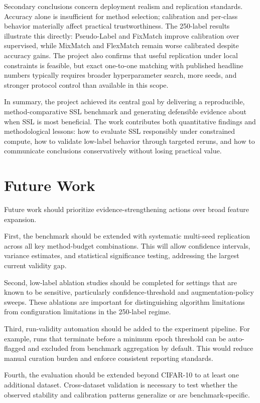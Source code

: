 Secondary conclusions concern deployment realism and replication standards. Accuracy alone is insufficient for method selection; calibration and per-class behavior materially affect practical trustworthiness. The 250-label results illustrate this directly: Pseudo-Label and FixMatch improve calibration over supervised, while MixMatch and FlexMatch remain worse calibrated despite accuracy gains. The project also confirms that useful replication under local constraints is feasible, but exact one-to-one matching with published headline numbers typically requires broader hyperparameter search, more seeds, and stronger protocol control than available in this scope.

In summary, the project achieved its central goal by delivering a reproducible, method-comparative SSL benchmark and generating defensible evidence about when SSL is most beneficial. The work contributes both quantitative findings and methodological lessons: how to evaluate SSL responsibly under constrained compute, how to validate low-label behavior through targeted reruns, and how to communicate conclusions conservatively without losing practical value.

\section{Future Work}

Future work should prioritize evidence-strengthening actions over broad feature expansion.

First, the benchmark should be extended with systematic multi-seed replication across all key method-budget combinations. This will allow confidence intervals, variance estimates, and statistical significance testing, addressing the largest current validity gap.

Second, low-label ablation studies should be completed for settings that are known to be sensitive, particularly confidence-threshold and augmentation-policy sweeps. These ablations are important for distinguishing algorithm limitations from configuration limitations in the 250-label regime.

Third, run-validity automation should be added to the experiment pipeline. For example, runs that terminate before a minimum epoch threshold can be auto-flagged and excluded from benchmark aggregation by default. This would reduce manual curation burden and enforce consistent reporting standards.

Fourth, the evaluation should be extended beyond CIFAR-10 to at least one additional dataset. Cross-dataset validation is necessary to test whether the observed stability and calibration patterns generalize or are benchmark-specific.

